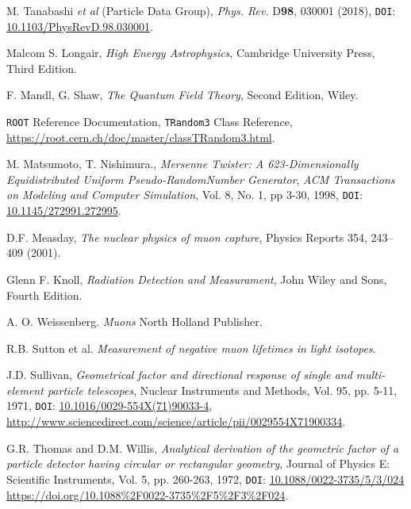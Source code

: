 \documentclass[a4paper, 12pt]{report}
\begin{document}
\begin{thebibliography}{30}


 M. Tanabashi \emph{et al}	(Particle Data Group), \emph{Phys. Rev.} D\textbf{98}, 030001 (2018), \texttt{DOI}: \href{http://pdg.lbl.gov/}{10.1103/PhysRevD.98.030001}.

Malcom S. Longair, \emph{High Energy Astrophysics}, Cambridge University Press, Third Edition.

F. Mandl, G. Shaw, \emph{The Quantum Field Theory}, Second Edition, Wiley.

\texttt{ROOT} Reference Documentation, \texttt{TRandom3} Class Reference, \url{https://root.cern.ch/doc/master/classTRandom3.html}.

 M. Matsumoto, T. Nishimura., \emph{Mersenne Twister: A 623-Dimensionally Equidistributed Uniform Pseudo-RandomNumber Generator}, \emph{ACM Transactions on Modeling and Computer Simulation}, Vol. 8, No. 1, pp 3-30, 1998, \texttt{DOI}: \href{https://dl.acm.org/doi/pdf/10.1145/272991.272995?download=true}{10.1145/272991.272995}.

 D.F. Measday, \emph{The nuclear physics of muon capture}, Physics Reports 354, 243–409 (2001).

 Glenn F. Knoll, \emph{Radiation Detection and Measurament}, John Wiley and Sons, Fourth Edition.

 A. O. Weissenberg. \emph{Muons} North Holland Publisher.

 R.B. Sutton et al. \emph{Measurement of negative muon lifetimes in light isotopes}.

	J.D. Sullivan, 
	\textit{Geometrical factor and directional response of single and multi-element particle telescopes}, 
	Nuclear Instruments and Methods, 
	Vol. 95, 
	pp. 5-11, 
	1971, 
	\texttt{DOI}: \href{https://doi.org/10.1016/0029-554X(71)90033-4}{10.1016/0029-554X(71)90033-4}, 
	\url{http://www.sciencedirect.com/science/article/pii/0029554X71900334}.
	
	G.R. Thomas and D.M. Willis, 
	\textit{Analytical derivation of the geometric factor of a particle detector having circular or rectangular geometry}, 
	Journal of Physics E: Scientific Instruments,
	Vol. 5, 
	pp. 260-263, 
	1972, 
	\texttt{DOI}: \href{https://iopscience.iop.org/article/10.1088/0022-3735/5/3/024}{10.1088/0022-3735/5/3/024}
	\url{https://doi.org/10.1088\%2F0022-3735\%2F5\%2F3\%2F024}.
	

\end{thebibliography}
\end{document}
